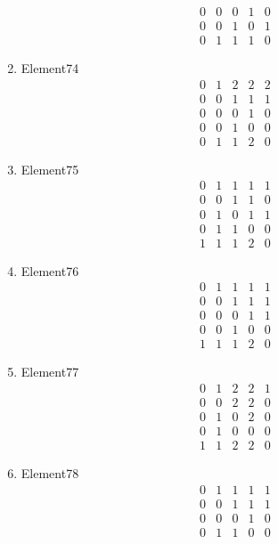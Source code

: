 \documentclass[12pt]{article}
\begin{document}
\begin{multicols}{3}
\begin{enumerate}
\begin{equation*}
\begin{array}{ccccc}
0&0&0&1&0\\
0&0&1&0&1\\
0&1&1&1&0
\end{array}
\end{equation*}
\item Element74
\begin{equation*}
\begin{array}{ccccc}
0&1&2&2&2\\
0&0&1&1&1\\
0&0&0&1&0\\
0&0&1&0&0\\
0&1&1&2&0
\end{array}
\end{equation*}
\item Element75
\begin{equation*}
\begin{array}{ccccc}
0&1&1&1&1\\
0&0&1&1&0\\
0&1&0&1&1\\
0&1&1&0&0\\
1&1&1&2&0
\end{array}
\end{equation*}
\item Element76
\begin{equation*}
\begin{array}{ccccc}
0&1&1&1&1\\
0&0&1&1&1\\
0&0&0&1&1\\
0&0&1&0&0\\
1&1&1&2&0
\end{array}
\end{equation*}
\item Element77
\begin{equation*}
\begin{array}{ccccc}
0&1&2&2&1\\
0&0&2&2&0\\
0&1&0&2&0\\
0&1&0&0&0\\
1&1&2&2&0
\end{array}
\end{equation*}
\item Element78
\begin{equation*}
\begin{array}{ccccc}
0&1&1&1&1\\
0&0&1&1&1\\
0&0&0&1&0\\
0&1&1&0&0\\

\end{array}
\end{equation*}
\end{enumerate}
\end{multicols}
\end{document}
